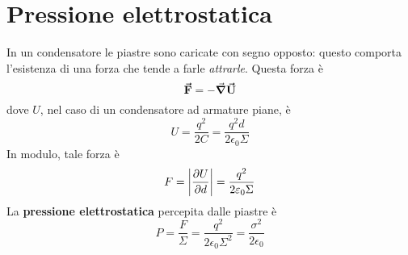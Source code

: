 \section{Pressione elettrostatica}
In un condensatore le piastre sono caricate con segno opposto: questo comporta l'esistenza di una forza che tende a farle \textit{attrarle}. Questa forza è
\begin{equation}
	\vb*{\va{F}}=-\grad{\vb*{\va{U}}}
\end{equation}
dove $U$, nel caso di un condensatore ad armature piane, è
\begin{equation*}
	U=\frac{q^2}{2C}=\frac{q^2d}{2\epsilon_0\Sigma}
\end{equation*}
In modulo, tale forza è
\begin{equation}
	F=\abs{\pdv{U}{d}}=\frac{q^2}{2\varepsilon_0\Sigma}
\end{equation}
La \textbf{pressione elettrostatica} percepita dalle piastre è
\begin{equation}
	P=\frac{F}{\Sigma}=\frac{q^2}{2\epsilon_0\Sigma^2}=\frac{\sigma^2}{2\epsilon_0}
\end{equation}
